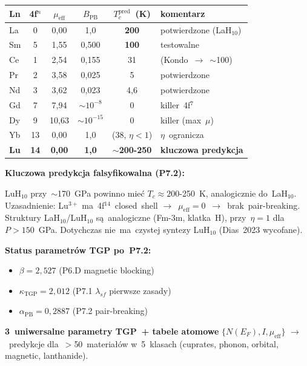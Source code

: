 \begin{center}\small
\begin{tabular}{lccccl}
Ln & 4f$^n$ & $\mu_\text{eff}$ & $B_\text{PB}$ & $T_c^\text{pred}$~(K) & komentarz \\
\hline
La & 0  & 0,00  & 1,0        & \textbf{200} & potwierdzone (LaH$_{10}$) \\
Sm & 5  & 1,55  & 0,500      & \textbf{100} & testowalne \\
Ce & 1  & 2,54  & 0,155      & 31 & (Kondo~$\to$~$\sim$100) \\
Pr & 2  & 3,58  & 0,025      & 5  & potwierdzone \\
Nd & 3  & 3,62  & 0,023      & 4,6& potwierdzone \\
Gd & 7  & 7,94  & $\sim 10^{-8}$ & 0 & killer~4f$^7$ \\
Dy & 9  & 10,63 & $\sim 10^{-15}$ & 0 & killer (max~$\mu$) \\
Yb & 13 & 0,00  & 1,0        & (38, $\eta\!<\!1$) & $\eta$~ogranicza \\
\textbf{Lu} & \textbf{14} & \textbf{0,00} & \textbf{1,0} & \textbf{$\sim$200-250} & \textbf{kluczowa predykcja} \\
\end{tabular}
\end{center}

\medskip\noindent\textbf{Kluczowa predykcja falsyfikowalna (P7.2):}

LuH$_{10}$ przy~$\sim$170~GPa powinno mie\'c $T_c\!\approx\!200$-250~K,
analogicznie do~LaH$_{10}$. Uzasadnienie: Lu$^{3+}$ ma~4f$^{14}$~closed~shell
$\to$~$\mu_\text{eff}\!=\!0$~$\to$~brak~pair-breaking. Struktury LaH$_{10}$/LuH$_{10}$
s\k{a}~analogiczne (Fm-3m, klatka~H), przy~$\eta\!=\!1$ dla~$P\!>\!150$~GPa.
Dotychczas nie~ma~czystej syntezy LuH$_{10}$ (Dias~2023 wycofane).

\medskip\noindent\textbf{Status parametr\'ow TGP po~P7.2:}
\begin{itemize}\itemsep0pt
  \item $\beta\!=\!2{,}527$ (P6.D magnetic blocking)
  \item $\kappa_\text{TGP}\!=\!2{,}012$ (P7.1 $\lambda_{sf}$ pierwsze zasady)
  \item $\alpha_\text{PB}\!=\!0{,}2887$ (P7.2 pair-breaking)
\end{itemize}

\noindent \textbf{3~uniwersalne parametry TGP~+ tabele atomowe} $\{N(E_F), I, \mu_\text{eff}\}$
$\to$~predykcje dla~$>$50~materia\l{}\'ow w~5~klasach (cuprates, phonon, orbital, magnetic, lanthanide).

